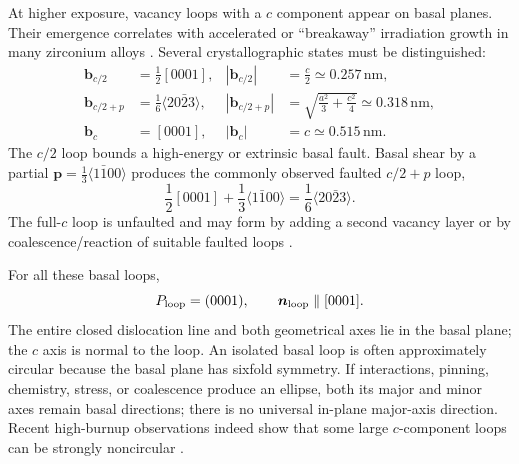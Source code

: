 \documentclass[11pt]{article}
\newcommand{\bvec}{\bm b}
\newcommand{\nvec}{\bm n}
\newcommand{\SI}[2]{\ensuremath{#1\,#2}}
\newcommand{\meter}{\mathrm{m}}
\newcommand{\nano}{\mathrm{n}}
\begin{document}
At higher exposure, vacancy loops with a $c$ component appear on basal planes. Their emergence correlates with accelerated or ``breakaway'' irradiation growth in many zirconium alloys \citep{Griffiths1987Neutron,Harte2017Matrix}. Several crystallographic states must be distinguished:
\begin{align}
 \bvec_{c/2}&=\frac12[0001], & |\bvec_{c/2}|&=\frac c2\simeq\SI{0.257}{\nano\meter},
 \label{eq:c2}\\
 \bvec_{c/2+p}&=\frac16\langle20\bar23\rangle,
 & |\bvec_{c/2+p}|&=\sqrt{\frac{a^2}{3}+\frac{c^2}{4}}
 \simeq\SI{0.318}{\nano\meter},
 \label{eq:c2p}\\
 \bvec_c&=[0001], & |\bvec_c|&=c\simeq\SI{0.515}{\nano\meter}.
 \label{eq:cfull}
\end{align}
The $c/2$ loop bounds a high-energy or extrinsic basal fault. Basal shear by a partial $\bm p=\tfrac13\langle1\bar100\rangle$ produces the commonly observed faulted $c/2+p$ loop,
\begin{equation}
 \frac12[0001]+\frac13\langle1\bar100\rangle
 =\frac16\langle20\bar23\rangle.
\end{equation}
The full-$c$ loop is unfaulted and may form by adding a second vacancy layer or by coalescence/reaction of suitable faulted loops \citep{Griffiths1987Neutron,Hulse2021Atomistic,Varvenne2014Vacancy}.

For all these basal loops,
\begin{equation}
 P_{\rm loop}=(0001),\qquad \nvec_{\rm loop}\parallel[0001].
 \label{eq:c-geometry}
\end{equation}
The entire closed dislocation line and both geometrical axes lie in the basal plane; the $c$ axis is normal to the loop. An isolated basal loop is often approximately circular because the basal plane has sixfold symmetry. If interactions, pinning, chemistry, stress, or coalescence produce an ellipse, both its major and minor axes remain basal directions; there is no universal in-plane major-axis direction. Recent high-burnup observations indeed show that some large $c$-component loops can be strongly noncircular \citep{Mayweg2024Islands}.
\end{document}
